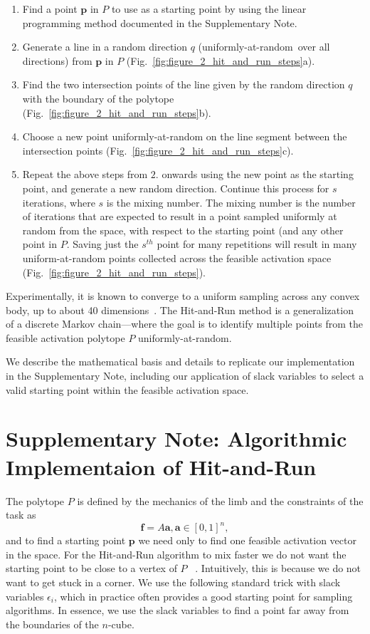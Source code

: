 \documentclass[letterpaper]{article}
\begin{document}
\begin{enumerate}
\item Find a point $\textbf{p}$ in $P$ to use as a starting point by using the linear programming method documented in the Supplementary Note.
\item Generate a line in a random direction $q$ (uniformly-at-random\ over all directions) from $\textbf{p}$ in $P$ (Fig.~\ref{fig:figure_2_hit_and_run_steps}a).
\item Find the two intersection points of the line given by the random direction $q$ with the boundary of the polytope (Fig.~\ref{fig:figure_2_hit_and_run_steps}b).
\item Choose a new point uniformly-at-random on the line segment between the intersection points (Fig.~\ref{fig:figure_2_hit_and_run_steps}c).
\item Repeat the above steps from $2.$ onwards using the new point as the starting point, and generate a new random direction.
Continue this process for $s$ iterations, where $s$ is the mixing number. The mixing number is the number of iterations that are expected to result in a point sampled uniformly at random from the space, with respect to the starting point (and any other point in $P$. Saving just the $s^{th}$ point for many repetitions will result in many uniform-at-random points collected across the feasible activation space (Fig.~\ref{fig:figure_2_hit_and_run_steps}).
\end{enumerate}



Experimentally, it is known to converge to a uniform sampling across any convex body, up to about 40 dimensions~\cite{smith1984efficient}. The Hit-and-Run method is a generalization of a discrete Markov chain---where the goal is to identify multiple points from the feasible activation polytope $P$ uniformly-at-random.

We describe the mathematical basis and details to replicate our implementation in the Supplementary Note, including our application of slack variables to select a valid starting point within the feasible activation space.




\section*{Supplementary Note: Algorithmic Implementaion of Hit-and-Run}
The polytope $P$ is defined by the mechanics of the limb and the constraints of the task as
\[\textbf{f} = A\textbf{a}, \textbf{a} \in [0,1]^n,\]
and to find a starting point $\textbf{p}$ we need only to find one feasible activation vector in the space.
For the Hit-and-Run algorithm to mix faster we do not want the starting point to be close to a vertex of $P$ ~\cite{Lovasz}. Intuitively, this is because we do not want to get stuck in a corner.
We use the following standard trick with slack variables $\epsilon_i$, which in practice often provides a good starting point for sampling algorithms. In essence, we use the slack variables to find a point far away from the boundaries of the $n$-cube.
\end{document}
